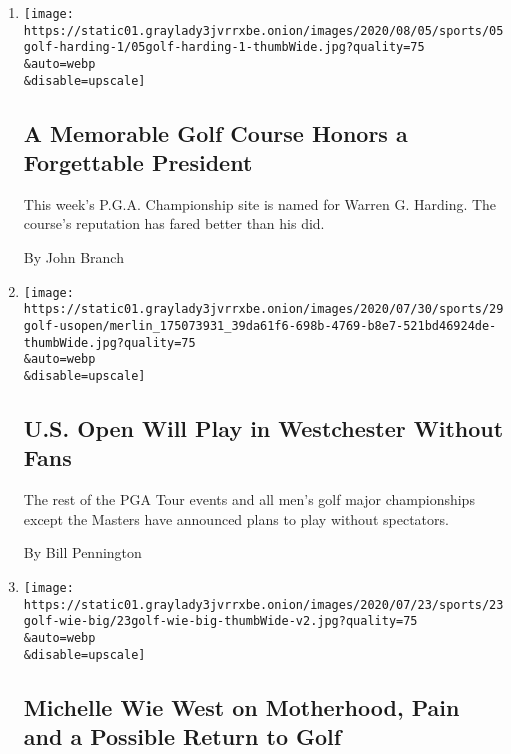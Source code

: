 \begin{enumerate}
\def\labelenumi{\arabic{enumi}.}
\item
  \href{/2020/08/05/sports/golf/pga-championship-harding-park.html}{}

  \texttt{[image: https://static01.graylady3jvrrxbe.onion/images/2020/08/05/sports/05golf-harding-1/05golf-harding-1-thumbWide.jpg?quality=75\\\&auto=webp\\\&disable=upscale]}

  \hypertarget{a-memorable-golf-course-honors-a-forgettable-president}{%
  \subsection{A Memorable Golf Course Honors a Forgettable
  President}\label{a-memorable-golf-course-honors-a-forgettable-president}}

  This week's P.G.A. Championship site is named for Warren G. Harding.
  The course's reputation has fared better than his did.

  By John Branch
\item
  \href{/2020/07/29/sports/golf/us-open-westchester-without-fans.html}{}

  \texttt{[image: https://static01.graylady3jvrrxbe.onion/images/2020/07/30/sports/29golf-usopen/merlin\_175073931\_39da61f6-698b-4769-b8e7-521bd46924de-thumbWide.jpg?quality=75\\\&auto=webp\\\&disable=upscale]}

  \hypertarget{us-open-will-play-in-westchester-without-fans}{%
  \subsection{U.S. Open Will Play in Westchester Without
  Fans}\label{us-open-will-play-in-westchester-without-fans}}

  The rest of the PGA Tour events and all men's golf major championships
  except the Masters have announced plans to play without spectators.

  By Bill Pennington
\item
  \href{/2020/07/24/sports/golf/michelle-wie-golf.html}{}

  \texttt{[image: https://static01.graylady3jvrrxbe.onion/images/2020/07/23/sports/23golf-wie-big/23golf-wie-big-thumbWide-v2.jpg?quality=75\\\&auto=webp\\\&disable=upscale]}

  \hypertarget{michelle-wie-west-on-motherhood-pain-and-a-possible-return-to-golf}{%
  \subsection{Michelle Wie West on Motherhood, Pain and a Possible
  Return to
  Golf}\label{michelle-wie-west-on-motherhood-pain-and-a-possible-return-to-golf}}


\end{enumerate}
